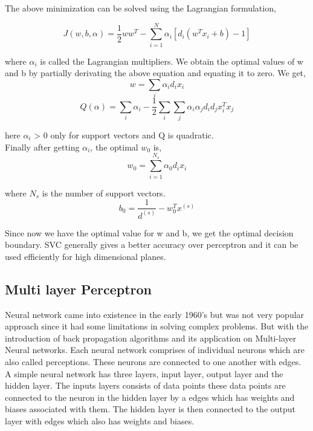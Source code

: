 \documentclass[sigconf]{acmart}
\begin{document}
The above minimization can be solved using the Lagrangian formulation,

\begin{equation}
    J(w,b,\alpha) = \frac{1}{2}ww^T - \sum^{N}_{i=1}\alpha_i[ d_i(w^Tx_i +b)-1]
\end{equation}

where $\alpha_i$ is called the Lagrangian multipliers. We obtain the optimal values of w and b by partially derivating the above equation and equating it to zero. We get,
\begin{equation}
    w = \sum_i \alpha_id_ix_i
\end{equation}
\begin{equation}
    Q(\alpha) = \sum_i \alpha_i - \frac{1}{2}\sum_i\sum_j \alpha_i\alpha_jd_id_jx_i^Tx_j
\end{equation}

here $\alpha_i$ > 0 only for support vectors and Q is quadratic.\\
Finally after getting $\alpha_i$, the optimal $w_0$ is,
\begin{equation}
    w_0 = \sum_{i=1}^{N_s} \alpha_0d_ix_i
\end{equation}

where $N_s$ is the number of support vectors. 
\begin{equation}
    b_0 = \frac{1}{d^(s)} - w_0^Tx^{(s)}
\end{equation}

Since now we have the optimal value for w and b, we get the optimal decision boundary. SVC generally gives a better accuracy over perceptron and it can be used efficiently for high dimensional planes.
\subsection{Multi layer Perceptron}

Neural network came into existence in the early 1960's but was not very popular approach since it had some limitations in solving complex problems. But with the introduction of back propagation algorithms and its application on Multi-layer Neural networks. Each neural network comprises of individual neurons which are also called perceptions. These neurons are connected to one another with edges. A simple neural network has three layers, input layer, output layer and the hidden layer. The inputs layers consists of data points these data points are connected to the neuron in the hidden layer by a edges which has weights and biases associated with them. The hidden layer is then connected to the output layer with edges which also has weights and biases.
\end{document}
